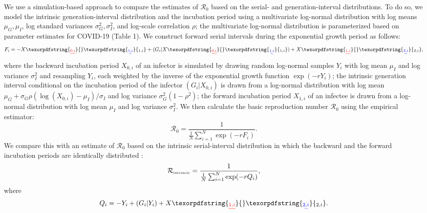 \documentclass[12pt]{article}
\newcommand{\Rx}[1]{\ensuremath{{\mathcal R}_{#1}}\xspace}
\newcommand{\Ro}{\Rx{0}}
\newcommand{\Rintrinsic}{\ensuremath{{\mathcal R}_{\textrm{\tiny intrinsic}}}\xspace}
\providecommand{\DIFaddtex}[1]{{\protect\color{blue}\uwave{#1}}} %
\providecommand{\DIFdeltex}[1]{{\protect\color{red}\sout{#1}}}                      %
\providecommand{\DIFaddbegin}{} %
\providecommand{\DIFaddend}{} %
\providecommand{\DIFdelbegin}{} %
\providecommand{\DIFdelend}{} %
\providecommand{\DIFadd}[1]{\texorpdfstring{\DIFaddtex{#1}}{#1}} %
\providecommand{\DIFdel}[1]{\texorpdfstring{\DIFdeltex{#1}}{}} %
\newcommand{\DIFscaledelfig}{0.5}
\newlength{\DIFdelgraphicswidth} %
\newlength{\DIFdelgraphicsheight} %
\newcommand{\DIFaddincludegraphics}[2][]{{\color{blue}\fbox{\DIFOincludegraphics[#1]{#2}}}} %
\newcommand{\DIFdelincludegraphics}[2][]{%
\sbox{\DIFdelgraphicsbox}{\DIFOincludegraphics[#1]{#2}}%
\settoboxwidth{\DIFdelgraphicswidth}{\DIFdelgraphicsbox} %
\settoboxtotalheight{\DIFdelgraphicsheight}{\DIFdelgraphicsbox} %
\scalebox{\DIFscaledelfig}{%
\parbox[b]{\DIFdelgraphicswidth}{\usebox{\DIFdelgraphicsbox}\\[-\baselineskip] \rule{\DIFdelgraphicswidth}{0em}}\llap{\resizebox{\DIFdelgraphicswidth}{\DIFdelgraphicsheight}{%
\setlength{\unitlength}{\DIFdelgraphicswidth}%
\begin{picture}(1,1)%
\thicklines\linethickness{2pt} %
{\color[rgb]{1,0,0}\put(0,0){\framebox(1,1){}}}%
{\color[rgb]{1,0,0}\put(0,0){\line( 1,1){1}}}%
{\color[rgb]{1,0,0}\put(0,1){\line(1,-1){1}}}%
\end{picture}%
}\hspace*{3pt}}} %
} %
\DeclareRobustCommand{\DIFaddbegin}{\DIFOaddbegin \let\includegraphics\DIFaddincludegraphics} %
\DeclareRobustCommand{\DIFaddend}{\DIFOaddend \let\includegraphics\DIFOincludegraphics} %
\DeclareRobustCommand{\DIFdelbegin}{\DIFOdelbegin \let\includegraphics\DIFdelincludegraphics} %
\DeclareRobustCommand{\DIFdelend}{\DIFOaddend \let\includegraphics\DIFOincludegraphics} %
\begin{document}
We use a simulation-based approach to compare the estimates of \Ro based on the serial- and generation-interval distributions. 
To do so, we model the intrinsic generation-interval distribution and the incubation period using a multivariate log-normal distribution with log means $\mu_G, \mu_I$, log standard variances $\sigma_G^2, \sigma_I^2$, and log-scale correlation $\rho$;
the multivariate log-normal distribution is parameterized based on parameter estimates for COVID-19 (Table 1).
We construct forward serial intervals during the exponential growth period as follows:
\begin{equation}
F_i = -X\DIFdelbegin \DIFdel{_{0,i} }\DIFdelend \DIFaddbegin \DIFadd{_{1,i} }\DIFaddend + (G_i|X\DIFdelbegin \DIFdel{_{0,i}}\DIFdelend \DIFaddbegin \DIFadd{_{1,i}}\DIFaddend ) + X\DIFdelbegin \DIFdel{_{1,i}}\DIFdelend \DIFaddbegin \DIFadd{_{2,i}}\DIFaddend ,
\end{equation}
where the backward incubation period \DIFdelbegin \DIFdel{$X_{0,i}$ }\DIFdelend \DIFaddbegin \DIFadd{$X_{1,i}$ }\DIFaddend of an infector is simulated by drawing random log-normal samples $Y_i$ with log mean $\mu_I$ and log variance $\sigma_I^2$ and resampling $Y_i$, each weighted by the inverse of the exponential growth function $\exp(-rY_i)$;
the intrinsic generation interval conditional on the incubation period of the infector \DIFdelbegin \DIFdel{$(G_i|X_{0,i})$ }\DIFdelend \DIFaddbegin \DIFadd{$(G_i|X_{1,i})$ }\DIFaddend is drawn from a log-normal distribution with log mean \DIFdelbegin \DIFdel{$\mu_G + \sigma_G \rho (\log(X_{0,i}) - \mu_I)/\sigma_I$ }\DIFdelend \DIFaddbegin \DIFadd{$\mu_G + \sigma_G \rho (\log(X_{1,i}) - \mu_I)/\sigma_I$ }\DIFaddend and log variance $\sigma_G^2 (1-\rho^2)$;
the forward incubation period \DIFdelbegin \DIFdel{$X_{1,i}$ }\DIFdelend \DIFaddbegin \DIFadd{$X_{2,i}$ }\DIFaddend of an infectee is drawn from a log-normal distribution with log mean $\mu_I$ and log variance $\sigma_I^2$.
We then calculate the basic reproduction number \Ro using the empirical estimator:
\begin{equation}
\Ro = \frac{1}{\frac{1}{N}\sum_{i=1}^N \exp(- r F_i)}.
\end{equation}
We compare this with an estimate of \Ro based on the intrinsic serial-interval distribution in which the backward and the forward incubation periods are identically distributed \citep{svensson2007note,klinkenberg2011correlation,champredon2018equivalence, britton2019estimation}:
\begin{equation}
  \Rintrinsic = \frac{1}{\frac{1}{N}\sum_{i=1}^N \exp(- r Q_i)},
\end{equation}
where
\begin{equation}
Q_i = -Y_i + (G_i|Y_i) + X\DIFdelbegin \DIFdel{_{1,i}}\DIFdelend \DIFaddbegin \DIFadd{_{2,i}}\DIFaddend .
\end{equation}
\end{document}

